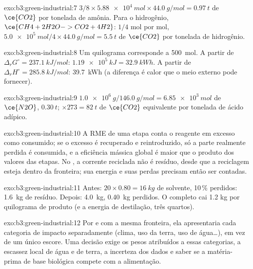 \begin{solution}{exo:b3:green-industrial:7}
$3/8 \times \qty{5.88e4}{mol} \times \qty{44.0}{g/mol} = \qty{0.97}{t}$ de $\ce{CO2}$ por tonelada de amônia. Para o hidrogênio, $\ce{CH4 + 2H2O -> CO2 + 4H2}$:
$1/4$ mol por mol, $\qty{5.0e5}{mol}/4 \times \qty{44.0}{g/mol} = \qty{5.5}{t}$ de $\ce{CO2}$ por tonelada de hidrogênio.
\end{solution}

\begin{solution}{exo:b3:green-industrial:8}
Um quilograma corresponde a \qty{500}{mol}. A partir de $\Delta_rG^\circ = \qty{237.1}{kJ/mol}$: $\qty{1.19e5}{kJ} = \qty{32.9}{kWh}$. A partir de $\Delta_rH^\circ = \qty{285.8}{kJ/mol}$: \qty{39.7}{kWh}
(a diferença é calor que o meio externo pode fornecer).
\end{solution}

\begin{solution}{exo:b3:green-industrial:9}
$\qty{1.0e6}{g}/\qty{146.0}{g/mol} = \qty{6.85e3}{mol}$ de $\ce{N2O}$, $\qty{0.30}{t}$; $\times 273 = \qty{82}{t}$ de $\ce{CO2}$ equivalente por tonelada de ácido adípico.
\end{solution}

\begin{solution}{exo:b3:green-industrial:10}
A RME de uma etapa conta o reagente em excesso como consumido; se o excesso é recuperado
e reintroduzido, só a parte realmente perdida é consumida, e a eficiência mássica
global é maior que o produto dos valores das etapas. No , a
corrente reciclada não é resíduo, desde que a reciclagem esteja dentro da fronteira;
sua energia e suas perdas precisam então ser contadas.
\end{solution}

\begin{solution}{exo:b3:green-industrial:11}
Antes: $20 \times 0.80 = \qty{16}{kg}$ de solvente, 10\,\% perdidos: \qty{1.6}{kg} de resíduo. Depois: \qty{4.0}{kg}, \qty{0.40}{kg} perdidos. O
 completo cai 1.2 kg por quilograma de produto (e a energia de
destilação, três quartos).
\end{solution}

\begin{solution}{exo:b3:green-industrial:12}
Por  e com a mesma fronteira, ela apresentaria cada categoria de impacto
separadamente (clima, uso da terra, uso de água\dots), em vez de um único escore. Uma
decisão exige os pesos atribuídos a essas categorias, a escassez local de água
e de terra, a incerteza dos dados e saber se a matéria-prima de base biológica
compete com a alimentação.
\end{solution}

